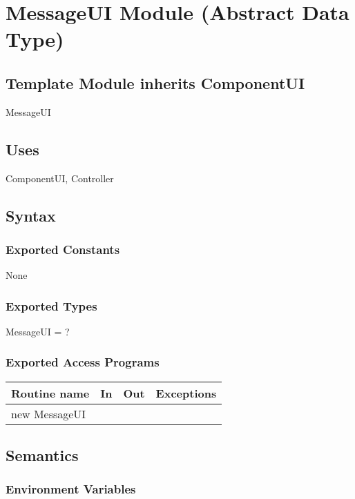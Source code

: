 \documentclass[12pt]{article}
\begin{document}
\newpage

\section* {MessageUI Module (Abstract Data Type)}

\subsection*{Template Module inherits ComponentUI}

MessageUI

\subsection* {Uses}

ComponentUI, Controller

\subsection* {Syntax}

\subsubsection* {Exported Constants}

None

\subsubsection* {Exported Types}

MessageUI = ?

\subsubsection* {Exported Access Programs}

\begin{tabular}{| l | l | l | p{6cm} |}
\hline
\textbf{Routine name} & \textbf{In} & \textbf{Out} & \textbf{Exceptions}\\
\hline
new MessageUI & & &  \\
\hline
\end{tabular}

\subsection* {Semantics}

\subsubsection* {Environment Variables}
\end{document}
